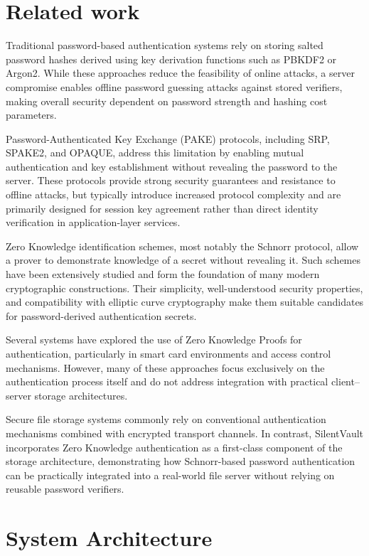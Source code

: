 \documentclass[conference]{IEEEtran}
\begin{document}
\section{Related work}
Traditional password-based authentication systems rely on storing salted
password hashes derived using key derivation functions such as PBKDF2 or
Argon2. While these approaches reduce the feasibility of online attacks,
a server compromise enables offline password guessing attacks against
stored verifiers, making overall security dependent on password strength
and hashing cost parameters.

Password-Authenticated Key Exchange (PAKE) protocols, including SRP,
SPAKE2, and OPAQUE, address this limitation by enabling mutual authentication
and key establishment without revealing the password to the server.
These protocols provide strong security guarantees and resistance to
offline attacks, but typically introduce increased protocol complexity
and are primarily designed for session key agreement rather than direct
identity verification in application-layer services.

Zero Knowledge identification schemes, most notably the Schnorr protocol,
allow a prover to demonstrate knowledge of a secret without revealing it.
Such schemes have been extensively studied and form the foundation of many
modern cryptographic constructions. Their simplicity, well-understood
security properties, and compatibility with elliptic curve cryptography
make them suitable candidates for password-derived authentication secrets.

Several systems have explored the use of Zero Knowledge Proofs for
authentication, particularly in smart card environments and access control
mechanisms. However, many of these approaches focus exclusively on the
authentication process itself and do not address integration with practical
client--server storage architectures.

Secure file storage systems commonly rely on conventional authentication
mechanisms combined with encrypted transport channels. In contrast,
SilentVault incorporates Zero Knowledge authentication as a first-class
component of the storage architecture, demonstrating how Schnorr-based
password authentication can be practically integrated into a real-world
file server without relying on reusable password verifiers.


\newpage

\section{System Architecture}
\end{document}
